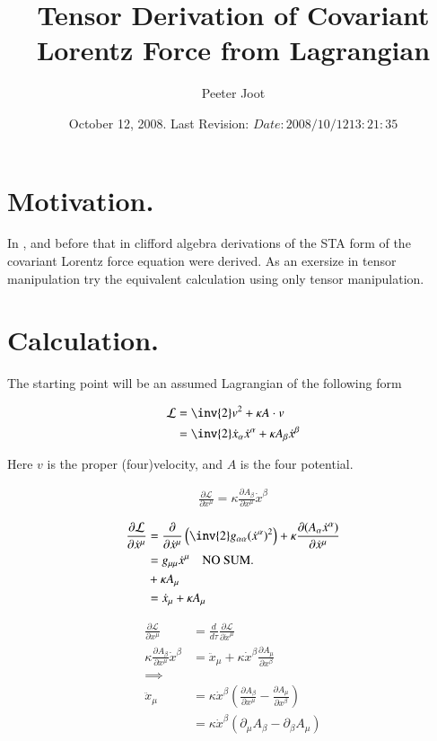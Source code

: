 \documentclass{article}
\title{Tensor Derivation of Covariant Lorentz Force from Lagrangian}
\author{Peeter Joot}
\date{ October 12, 2008.  Last Revision: $Date: 2008/10/12 13:21:35 $ }
\newcommand{\LL}[0]{\mathcal{L}}
\newcommand{\xdot}[0]{\dot{x}}
\newcommand{\xddot}[0]{\ddot{x}}
\newcommand{\PD}[2]{\frac{\partial {#2}}{\partial {#1}}}
\begin{document}
\maketitle{}

\tableofcontents

\section{ Motivation. }

In \cite{PJSrLorentzForce}, and before that in \cite{PJSrLagrangian} clifford
algebra derivations of the STA form of the covariant Lorentz force equation
were derived.  As an exersize in tensor manipulation try the equivalent
calculation using only tensor manipulation.

\section{ Calculation. }

The starting point will be an assumed Lagrangian of the following form

\begin{align*}
\LL &= \inv{2} v^2 + \kappa A \cdot v \\
&= \inv{2} \xdot_\alpha \xdot^\alpha + \kappa A_\beta \xdot^\beta
\end{align*}

Here $v$ is the proper (four)velocity, and $A$ is the four potential.

\begin{align*}
\PD{x^\mu}{\LL} = \kappa \PD{x^\mu}{A_\beta} \xdot^\beta
\end{align*}

\begin{align*}
\PD{\xdot^\mu}{\LL}
&= \PD{\xdot^\mu}{} \left( \inv{2} g_{\alpha\alpha} (\xdot^\alpha)^2 \right) + \kappa \PD{\xdot^\mu}{(A_\alpha \xdot^\alpha)} \\
&= g_{\mu\mu} \xdot^\mu \quad \text{NO SUM.} \\
&+ \kappa A_\mu \\
&= \xdot_\mu + \kappa A_\mu \\
\end{align*}

\begin{align*}
\PD{x^\mu}{\LL} &= \frac{d}{d\tau} \PD{\xdot^\mu}{\LL} \\
\kappa \PD{x^\mu}{A_\beta} \xdot^\beta &= \xddot_\mu + \kappa \xdot^\beta \PD{x^\beta}{A_\mu} \\
\implies \\
\xddot_\mu
&= \kappa \xdot^\beta \left( \PD{x^\mu}{A_\beta} - \PD{x^\beta}{A_\mu} \right) \\
&= \kappa \xdot^\beta \left( \partial_\mu {A_\beta} - \partial_{\beta}{A_\mu} \right) \\
\end{align*}
\end{document}
